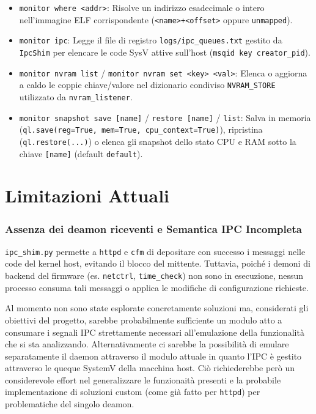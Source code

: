 \documentclass[11pt,a4paper]{article}
\begin{document}
\begin{itemize}
\begin{enumerate}
\begin{itemize}
            \item \texttt{monitor where <addr>}: Risolve un indirizzo esadecimale o intero nell'immagine ELF corrispondente (\texttt{<name>+<offset>} oppure \texttt{unmapped}).
            \item \texttt{monitor ipc}: Legge il file di registro \texttt{logs/ipc\_queues.txt} gestito da \texttt{IpcShim} per elencare le code SysV attive sull'host (\texttt{msqid key creator\_pid}).
            \item \texttt{monitor nvram list} / \texttt{monitor nvram set <key> <val>}: Elenca o aggiorna a caldo le coppie chiave/valore nel dizionario condiviso \texttt{NVRAM\_STORE} utilizzato da \texttt{nvram\_listener}.
            \item \texttt{monitor snapshot save [name]} / \texttt{restore [name]} / \texttt{list}: Salva in memoria (\texttt{ql.save(reg=True, mem=True, cpu\_context=True)}), ripristina (\texttt{ql.restore(...)}) o elenca gli snapshot dello stato CPU e RAM sotto la chiave \texttt{[name]} (default \texttt{default}).
        \end{itemize}
    \end{enumerate}
\end{itemize}

\section{Limitazioni Attuali}
\subsubsection{Assenza dei deamon riceventi e Semantica IPC Incompleta} 
    \texttt{ipc\_shim.py} permette a \texttt{httpd} e \texttt{cfm} di depositare con successo i messaggi nelle code del kernel host, evitando il blocco del mittente. Tuttavia, poiché i demoni di backend del firmware (es. \texttt{netctrl}, \texttt{time\_check}) non sono in esecuzione, nessun processo consuma tali messaggi o applica le modifiche di configurazione richieste.

    Al momento non sono state esplorate concretamente soluzioni ma, considerati gli obiettivi del progetto, sarebbe probabilmente sufficiente un modulo atto a consumare i segnali IPC strettamente necessari all'emulazione della funzionalità che si sta analizzando. Alternativamente ci sarebbe la possibilità di emulare separatamente il daemon attraverso il modulo attuale in quanto l'IPC è gestito attraverso le queque SystemV della macchina host. Ciò richiederebbe però un considerevole effort nel generalizzare le funzionaità presenti e la probabile implementazione di soluzioni custom (come già fatto per \texttt{httpd}) per problematiche del singolo deamon.
\end{document}
